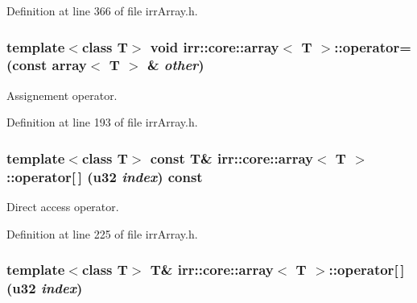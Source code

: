 Definition at line 366 of file irrArray.h.\hypertarget{classirr_1_1core_1_1array_a0f0ea56d18bb90eb5c8f286c7273a88}{
\subsubsection[{operator=}]{\setlength{\rightskip}{0pt plus 5cm}template$<$class T$>$ void {\bf irr::core::array}$<$ T $>$::operator= (const {\bf array}$<$ T $>$ \& {\em other})}}
\label{classirr_1_1core_1_1array_a0f0ea56d18bb90eb5c8f286c7273a88}


Assignement operator. 



Definition at line 193 of file irrArray.h.\hypertarget{classirr_1_1core_1_1array_db02c1c24954863613a6f2ab0f316bf2}{
\subsubsection[{operator[]}]{\setlength{\rightskip}{0pt plus 5cm}template$<$class T$>$ const T\& {\bf irr::core::array}$<$ T $>$::operator\mbox{[}$\,$\mbox{]} ({\bf u32} {\em index}) const}}
\label{classirr_1_1core_1_1array_db02c1c24954863613a6f2ab0f316bf2}


Direct access operator. 



Definition at line 225 of file irrArray.h.\hypertarget{classirr_1_1core_1_1array_67098e889f4e1f72e442f17dd50cff5f}{
\subsubsection[{operator[]}]{\setlength{\rightskip}{0pt plus 5cm}template$<$class T$>$ T\& {\bf irr::core::array}$<$ T $>$::operator\mbox{[}$\,$\mbox{]} ({\bf u32} {\em index})}}
\label{classirr_1_1core_1_1array_67098e889f4e1f72e442f17dd50cff5f}


